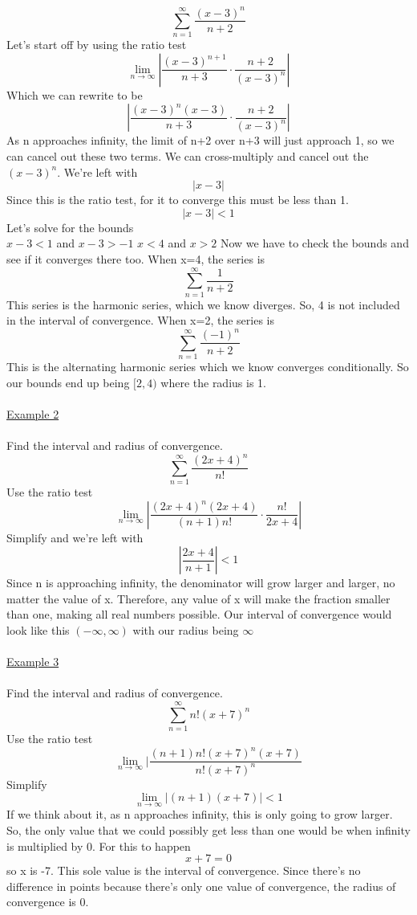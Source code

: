 \documentclass[a4paper,openright, 14pt]{article}
\begin{document}
$$\sum\limits_{n=1}^{\infty} \frac{(x-3)^n}{n+2}$$
Let's start off by using the ratio test
$$\lim_{n\to\infty} |\frac{(x-3)^{n+1}}{n+3}\cdot \frac{n+2}{(x-3)^n}|$$
Which we can rewrite to be
$$|\frac{(x-3)^n(x-3)}{n+3} \cdot \frac{n+2}{(x-3)^n}|$$
As n approaches infinity, the limit of n+2 over n+3 will just approach 1, so we can cancel out these two terms. We can cross-multiply and cancel out the $(x-3)^n$. We’re left with
$$|x-3|$$
Since this is the ratio test, for it to converge this must be less than 1.
$$|x-3|<1$$
Let’s solve for the bounds\\
$x-3<1$ and $x-3>-1$
$x<4$ and $x>2$
Now we have to check the bounds and see if it converges there too. 
When x=4, the series is 
$$\sum\limits_{n=1}^{\infty} \frac{1}{n+2}$$
This series is the harmonic series, which we know diverges. So, 4 is not included in the interval of convergence.
When x=2, the series is
$$\sum\limits_{n=1}^{\infty} \frac{(-1)^n}{n+2}$$
This is the alternating harmonic series which we know converges conditionally.
So our bounds end up being $[2,4)$ where the radius is 1.\\\\
\underline{Example 2}\\\\
Find the interval and radius of convergence.
$$\sum\limits_{n=1}^{\infty} \frac{(2x+4)^n}{n!}$$
Use the ratio test
$$\lim_{n\to\infty}|\frac{(2x+4)^n(2x+4)}{(n+1)n!} \cdot \frac{n!}{2x+4}|$$
Simplify and we’re left with
$$|\frac{2x+4}{n+1}|<1$$
Since n is approaching infinity, the denominator will grow larger and larger, no matter the value of x. Therefore, any value of x will make the fraction smaller than one, making all real numbers possible. Our interval of convergence would look like this
$(-\infty, \infty)$ with our radius being $\infty$\\\\
\underline{Example 3}\\\\
Find the interval and radius of convergence.
$$\sum\limits_{n=1}^{\infty} n!(x+7)^n$$
Use the ratio test
$$\lim_{n\to\infty}|\frac{(n+1)n!(x+7)^n(x+7)}{n!(x+7)^n}$$
Simplify
$$\lim_{n\to\infty}|(n+1)(x+7)|<1$$
If we think about it, as n approaches infinity, this is only going to grow larger. So, the only value that we could possibly get less than one would be when infinity is multiplied by 0. For this to happen 
$$x+7=0$$
so x is -7. This sole value is the interval of convergence. Since there’s no difference in points because there’s only one value of convergence, the radius of convergence is 0.
\end{document}
